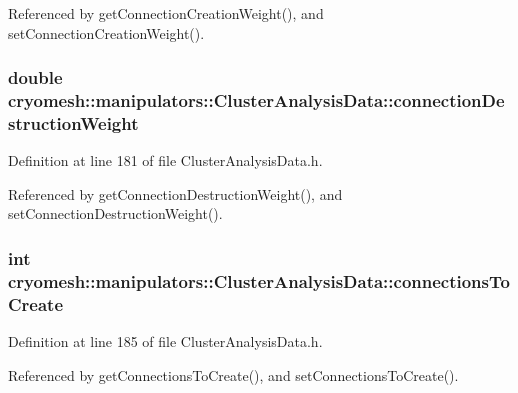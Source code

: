\-Referenced by get\-Connection\-Creation\-Weight(), and set\-Connection\-Creation\-Weight().

\hypertarget{classcryomesh_1_1manipulators_1_1ClusterAnalysisData_ac9f1a2eada7f214b62a257067ee7d336}{
\subsubsection[{connection\-Destruction\-Weight}]{\setlength{\rightskip}{0pt plus 5cm}double {\bf cryomesh\-::manipulators\-::\-Cluster\-Analysis\-Data\-::connection\-Destruction\-Weight}}}\label{classcryomesh_1_1manipulators_1_1ClusterAnalysisData_ac9f1a2eada7f214b62a257067ee7d336}


\-Definition at line 181 of file \-Cluster\-Analysis\-Data.\-h.



\-Referenced by get\-Connection\-Destruction\-Weight(), and set\-Connection\-Destruction\-Weight().

\hypertarget{classcryomesh_1_1manipulators_1_1ClusterAnalysisData_add3ac0cb45a6782d3d92d9d4ea181609}{
\subsubsection[{connections\-To\-Create}]{\setlength{\rightskip}{0pt plus 5cm}int {\bf cryomesh\-::manipulators\-::\-Cluster\-Analysis\-Data\-::connections\-To\-Create}}}\label{classcryomesh_1_1manipulators_1_1ClusterAnalysisData_add3ac0cb45a6782d3d92d9d4ea181609}


\-Definition at line 185 of file \-Cluster\-Analysis\-Data.\-h.



\-Referenced by get\-Connections\-To\-Create(), and set\-Connections\-To\-Create().

